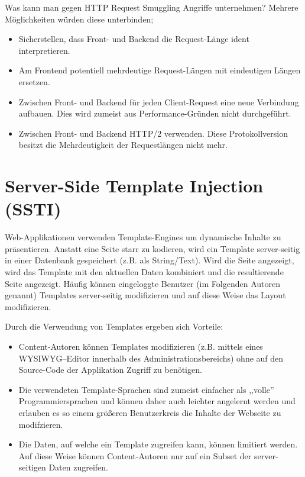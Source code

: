 Was kann man gegen HTTP Request Smuggling Angriffe unternehmen? Mehrere Möglichkeiten würden diese unterbinden;

\begin{itemize}
	\item Sicherstellen, dass Front- und Backend die Request-Länge ident interpretieren.
	\item Am Frontend potentiell mehrdeutige Request-Längen mit eindeutigen Längen ersetzen.
	\item Zwischen Front- und Backend für jeden Client-Request eine neue Verbindung aufbauen. Dies wird zumeist aus Performance-Gründen nicht durchgeführt.
	\item Zwischen Front- und Backend HTTP/2 verwenden. Diese Protokollversion besitzt die Mehrdeutigkeit der Requestlängen nicht mehr.
\end{itemize}

\section{Server-Side Template Injection (SSTI)}

Web-Applikationen verwenden Template-Engines um dynamische Inhalte zu präsentieren. Anstatt eine Seite starr zu kodieren, wird ein Template server-seitig in einer Datenbank gespeichert (z.B. als String/Text). Wird die Seite angezeigt, wird das Template mit den aktuellen Daten kombiniert und die resultierende Seite angezeigt. Häufig können eingeloggte Benutzer (im Folgenden  Autoren genannt) Templates server-seitig modifizieren und auf diese Weise das Layout modifizieren.

Durch die Verwendung von Templates ergeben sich Vorteile:

\begin{itemize}
	\item Content-Autoren können Templates modifizieren (z.B. mittels eines WYSIWYG--Editor innerhalb des Administrationsbereichs) ohne auf den Source-Code der Applikation Zugriff zu benötigen.
	\item Die verwendeten Template-Sprachen sind zumeist einfacher als ,,volle'' Programmiersprachen und können daher auch leichter angelernt werden und erlauben es so einem größeren Benutzerkreis die Inhalte der Webseite zu modifzieren.
	\item Die Daten, auf welche ein Template zugreifen kann, können limitiert werden. Auf diese Weise können Content-Autoren nur auf ein Subset der server-seitigen Daten zugreifen.
\end{itemize}

